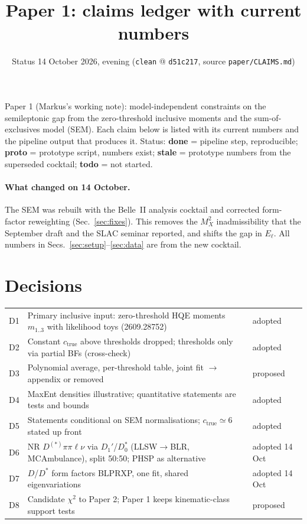 \documentclass[11pt]{article}
\title{Paper 1: claims ledger with current numbers}
\author{Status 14 October 2026, evening \quad (\texttt{clean} @ \texttt{d51c217}, source \texttt{paper/CLAIMS.md})}
\date{}
\newcommand{\done}{\textcolor{done}{\textbf{done}}}
\newcommand{\proto}{\textcolor{proto}{\textbf{proto}}}
\newcommand{\todo}{\textcolor{todo}{\textbf{todo}}}
\newcommand{\stale}{\textcolor{todo}{\textbf{stale}}}
\begin{document}
\maketitle

\noindent
Paper 1 (Markus's working note): model-independent constraints on the semileptonic gap from the zero-threshold
inclusive moments and the sum-of-exclusives model (SEM). Each claim below is listed with its current numbers and
the pipeline output that produces it. Status: \done{} = pipeline step, reproducible; \proto{} = prototype script,
numbers exist; \stale{} = prototype numbers from the superseded cocktail; \todo{} = not started.

\paragraph{What changed on 14 October.}
The SEM was rebuilt with the Belle~II analysis cocktail and corrected form-factor reweighting (Sec.~\ref{sec:fixes}).
This removes the $M_X^2$ inadmissibility that the September draft and the SLAC seminar reported, and shifts the gap in
$E_\ell$. All numbers in Secs.~\ref{sec:setup}--\ref{sec:data} are from the new cocktail.

\section{Decisions}
\begin{tabular}{@{}p{0.6cm}>{\raggedright\arraybackslash}p{11.2cm}p{3.6cm}@{}}
\toprule
D1 & Primary inclusive input: zero-threshold HQE moments $m_{1..3}$ with likelihood toys (2609.28752) & adopted \\
D2 & Constant $c_\text{true}$ above thresholds dropped; thresholds only via partial BFs (cross-check) & adopted \\
D3 & Polynomial average, per-threshold table, joint fit $\to$ appendix or removed & proposed \\
D4 & MaxEnt densities illustrative; quantitative statements are tests and bounds & adopted \\
D5 & Statements conditional on SEM normalisations; $c_\text{true}\simeq 6$ stated up front & adopted \\
D6 & NR $D^{(*)}\pi\pi\ell\nu$ via $D_1'$/$D_0^*$ (LLSW$\to$BLR, MCAmbulance), split 50:50; PHSP as alternative & adopted 14 Oct \\
D7 & $D$/$D^*$ form factors BLPRXP, one fit, shared eigenvariations & adopted 14 Oct \\
D8 & Candidate $\chi^2$ to Paper 2; Paper 1 keeps kinematic-class support tests & proposed \\
\bottomrule
\end{tabular}
\end{document}
